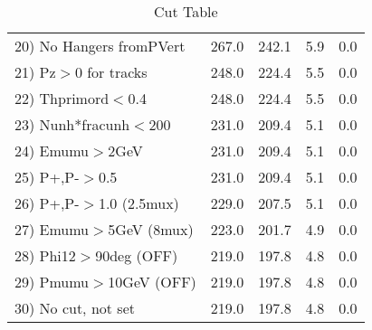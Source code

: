 \begin{table}[h!]
\begin{tabular}{||l||r|r|r|r||}
 20) No Hangers fromPVert &       267.0 &       242.1 &         5.9 &         0.0 \\
 21) Pz$>$0 for tracks    &       248.0 &       224.4 &         5.5 &         0.0 \\
 22) Thprimord$<$0.4      &       248.0 &       224.4 &         5.5 &         0.0 \\
 23) Nunh*fracunh$<$200   &       231.0 &       209.4 &         5.1 &         0.0 \\
 24) Emumu$>$2GeV         &       231.0 &       209.4 &         5.1 &         0.0 \\
 25) P+,P-$>$0.5          &       231.0 &       209.4 &         5.1 &         0.0 \\
 26) P+,P-$>$1.0 (2.5mux) &       229.0 &       207.5 &         5.1 &         0.0 \\
 27) Emumu$>$5GeV  (8mux) &       223.0 &       201.7 &         4.9 &         0.0 \\
 28) Phi12$>$90deg  (OFF) &       219.0 &       197.8 &         4.8 &         0.0 \\
 29) Pmumu$>$10GeV  (OFF) &       219.0 &       197.8 &         4.8 &         0.0 \\
 30) No cut, not set      &       219.0 &       197.8 &         4.8 &         0.0 \\
 \hline
 \hline
 \end{tabular}
 \caption{Cut Table \cohpip }
 \label{tab-cut_copip}
 \end{table}
